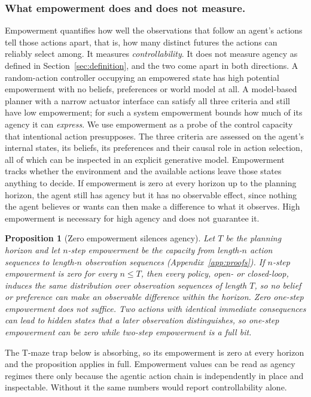 \documentclass[letterpaper]{article} %
\newtheorem{proposition}{Proposition}
\theoremstyle{definition}
\begin{document}
\subsubsection{What empowerment does and does not measure.}\label{sec:notagency}
Empowerment quantifies how well the observations that follow an agent's actions tell those actions apart, that is, how many distinct futures the actions can reliably select among. It measures \emph{controllability}. It does not measure agency as defined in Section~\ref{sec:definition}, and the two come apart in both directions. A random-action controller occupying an empowered state has high potential empowerment with no beliefs, preferences or world model at all. A model-based planner with a narrow actuator interface can satisfy all three criteria and still have low empowerment; for such a system empowerment bounds how much of its agency it can \emph{express}. We use empowerment as a probe of the control capacity that intentional action presupposes. The three criteria are assessed on the agent's internal states, its beliefs, its preferences and their causal role in action selection, all of which can be inspected in an explicit generative model. Empowerment tracks whether the environment and the available actions leave those states anything to decide. If empowerment is zero at every horizon up to the planning horizon, the agent still has agency but it has no observable effect, since nothing the agent believes or wants can then make a difference to what it observes. High empowerment is necessary for high agency and does not guarantee it.

\begin{proposition}[Zero empowerment silences agency]\label{prop:zero}
Let $T$ be the planning horizon and let $n$-step empowerment be the capacity from length-$n$ action sequences to length-$n$ observation sequences (Appendix~\ref{app:proofs}). If $n$-step empowerment is zero for every $n \le T$, then every policy, open- or closed-loop, induces the same distribution over observation sequences of length $T$, so no belief or preference can make an observable difference within the horizon. Zero one-step empowerment does not suffice. Two actions with identical immediate consequences can lead to hidden states that a later observation distinguishes, so one-step empowerment can be zero while two-step empowerment is a full bit.
\end{proposition}

The T-maze trap below is absorbing, so its empowerment is zero at every horizon and the proposition applies in full. Empowerment values can be read as agency regimes there only because the agentic action chain is independently in place and inspectable. Without it the same numbers would report controllability alone.
\end{document}
